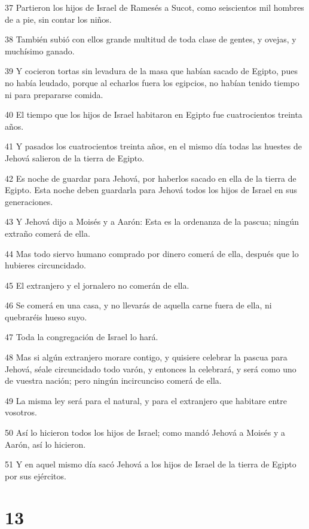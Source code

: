 \par 37 Partieron los hijos de Israel de Ramesés a Sucot, como seiscientos mil hombres de a pie, sin contar los niños.
\par 38 También subió con ellos grande multitud de toda clase de gentes, y ovejas, y muchísimo ganado.
\par 39 Y cocieron tortas sin levadura de la masa que habían sacado de Egipto, pues no había leudado, porque al echarlos fuera los egipcios, no habían tenido tiempo ni para prepararse comida.
\par 40 El tiempo que los hijos de Israel habitaron en Egipto fue cuatrocientos treinta años.
\par 41 Y pasados los cuatrocientos treinta años, en el mismo día todas las huestes de Jehová salieron de la tierra de Egipto.
\par 42 Es noche de guardar para Jehová, por haberlos sacado en ella de la tierra de Egipto. Esta noche deben guardarla para Jehová todos los hijos de Israel en sus generaciones.
\par 43 Y Jehová dijo a Moisés y a Aarón: Esta es la ordenanza de la pascua; ningún extraño comerá de ella.
\par 44 Mas todo siervo humano comprado por dinero comerá de ella, después que lo hubieres circuncidado.
\par 45 El extranjero y el jornalero no comerán de ella.
\par 46 Se comerá en una casa, y no llevarás de aquella carne fuera de ella, ni quebraréis hueso suyo.
\par 47 Toda la congregación de Israel lo hará.
\par 48 Mas si algún extranjero morare contigo, y quisiere celebrar la pascua para Jehová, séale circuncidado todo varón, y entonces la celebrará, y será como uno de vuestra nación; pero ningún incircunciso comerá de ella.
\par 49 La misma ley será para el natural, y para el extranjero que habitare entre vosotros.
\par 50 Así lo hicieron todos los hijos de Israel; como mandó Jehová a Moisés y a Aarón, así lo hicieron.
\par 51 Y en aquel mismo día sacó Jehová a los hijos de Israel de la tierra de Egipto por sus ejércitos.

\chapter{13}

